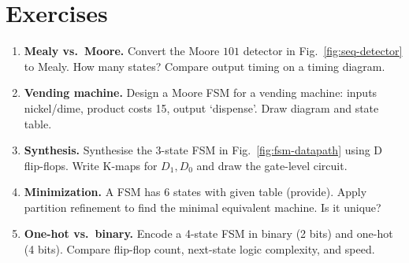 \section{Exercises}
\label{sec:ch05-exercises}
\begin{enumerate}[label=E5.\arabic*, leftmargin=*, itemsep=0.8em]
    \item \textbf{Mealy vs.\ Moore.} Convert the Moore $101$ detector in Fig.~\ref{fig:seq-detector} to Mealy. How many states? Compare output timing on a timing diagram.
    \item \textbf{Vending machine.} Design a Moore FSM for a vending machine: inputs nickel/dime, product costs 15\textcent, output `dispense'. Draw diagram and state table.
    \item \textbf{Synthesis.} Synthesise the 3-state FSM in Fig.~\ref{fig:fsm-datapath} using D flip-flops. Write K-maps for $D_1,D_0$ and draw the gate-level circuit.
    \item \textbf{Minimization.} A FSM has 6 states with given table (provide). Apply partition refinement to find the minimal equivalent machine. Is it unique?
    \item \textbf{One-hot vs.\ binary.} Encode a 4-state FSM in binary (2 bits) and one-hot (4 bits). Compare flip-flop count, next-state logic complexity, and speed.
\end{enumerate}
